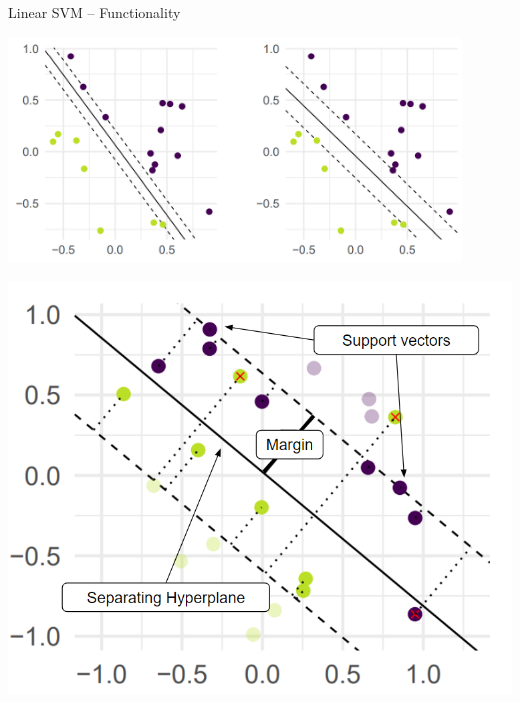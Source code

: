 \documentclass[11pt,compress,t,notes=noshow, xcolor=table]{beamer}
\begin{document}
\begin{frame}{Linear SVM -- Functionality}
\medskip
 \footnotesize
 \begin{minipage}{0.6\textwidth}
    \centering
    \includegraphics[width=0.9\textwidth]{figure/svm_motivation_hard_margin.png}
 \end{minipage}
  \normalsize
  \hfill\vline\hfill
 \begin{minipage}{0.3\textwidth}
    \centering
    \includegraphics[width=1.1\textwidth]{figure/svm_wording.png}
 \end{minipage}

\end{frame}

\end{document}
